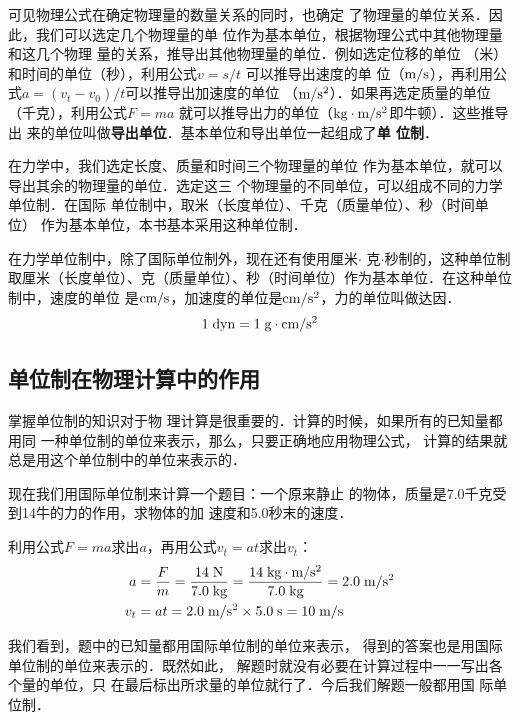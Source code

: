 可见物理公式在确定物理量的数量关系的同时，也确定
了物理量的单位关系．因此，我们可以选定几个物理量的单
位作为基本单位，根据物理公式中其他物理量和这几个物理
量的关系，推导出其他物理量的单位．例如选定位移的单位
（米）和时间的单位（秒），利用公式$v=s/t$
可以推导出速度的单
位（$\text{m}/\text{s}$），再利用公式$a=(v_t-v_0)/t$可以推导出加速度的单位
（$\text{m}/\text{s}^2$）．如果再选定质量的单位（千克），利用公式$F=ma$
就可以推导出力的单位（$\text{kg}\cdot \text{m}/\text{s}^2$即牛顿）．这些推导出
来的单位叫做\textbf{导出单位}．基本单位和导出单位一起组成了\textbf{单
位制}．

在力学中，我们选定长度、质量和时间三个物理量的单位
作为基本单位，就可以导出其余的物理量的单位．选定这三
个物理量的不同单位，可以组成不同的力学单位制．在国际
单位制中，取米（长度单位）、千克（质量单位）、秒（时间单位）
作为基本单位，本书基本采用这种单位制．

在力学单位制中，除了国际单位制外，现在还有使用厘米$\cdot$
克$\cdot$秒制的，这种单位制取厘米（长度单位）、克（质量单位）、秒（时间单位）作为基本单位．在这种单位制中，速度的单位
是$\text{cm}/\text{s}$，加速度的单位是$\text{cm}/\text{s}^2$，力的单位叫做达因．
\[1 \;\text{dyn} =1 \;\text{g}\cdot \text{cm}/\text{s}^2  \]


\subsection{单位制在物理计算中的作用}
掌握单位制的知识对于物
理计算是很重要的．计算的时候，如果所有的已知量都用同
一种单位制的单位来表示，那么，只要正确地应用物理公式，
计算的结果就总是用这个单位制中的单位来表示的．

现在我们用国际单位制来计算一个题目：一个原来静止
的物体，质量是7.0千克受到14牛的力的作用，求物体的加
速度和5.0秒末的速度．

利用公式$F= ma$求出$a$，再用公式$v_t= at$求出$v_t$：
\[\begin{split}
a&=\frac{F}{m}=\frac{14 \;\text{N}}{7.0\;\text{kg}}=\frac{14\;\text{kg}\cdot \text{m}/\text{s}^2}{7.0\;\text{kg}}=2.0\;\text{m}/\text{s}^2\\
v_t&=at=2.0\;\text{m}/\text{s}^2 \times 5.0\;\text{s}=10\;\text{m}/\text{s}
\end{split} \]

我们看到，题中的已知量都用国际单位制的单位来表示，
得到的答案也是用国际单位制的单位来表示的．既然如此，
解题时就没有必要在计算过程中一一写出各个量的单位，只
在最后标出所求量的单位就行了．今后我们解题一般都用国
际单位制．


